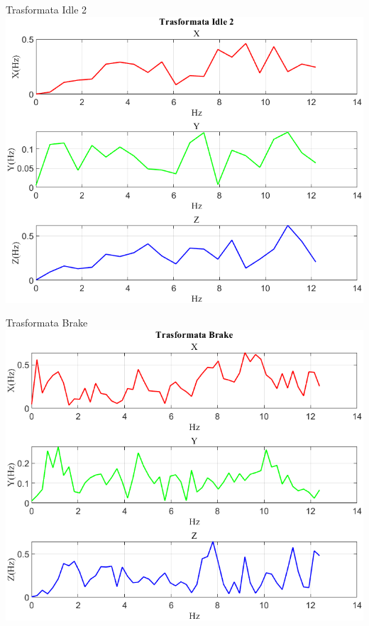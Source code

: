 \documentclass[beamer]{standalone}
\begin{document}
	\begin{frame}{{Trasformata Idle 2}}
		\centering\includegraphics[height=.8\textheight]{figure/Acc/Trasformata/Trasformata Idle 2}
	\end{frame}
	
	\begin{frame}{{Trasformata Brake}}
		\centering\includegraphics[height=.8\textheight]{figure/Acc/Trasformata/Trasformata Brake}
	\end{frame}
	
\end{document}
